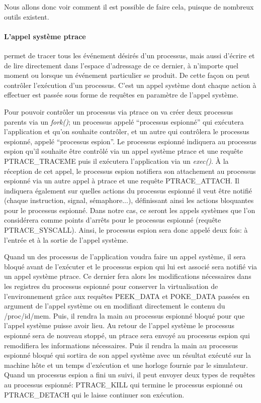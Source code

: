  Nous allons donc voir comment il est possible de faire cela, puisque de
 nombreux outils existent.
 
 \paragraph{L'appel système ptrace}\citet{INTERCEPTION:AS, INTERCEPTION:MARION}
 permet de tracer tous les événement désirés d'un processus, mais aussi d'écrire
 et de lire directement dans l'espace d'adressage de ce dernier, à n'importe
 quel moment ou lorsque un événement particulier se produit. De cette façon on
 peut contrôler l'exécution d'un processus. C'est un appel système dont chaque
 action à effectuer est passée sous forme de requêtes en paramètre de l'appel
 système.

Pour pouvoir contrôler un processus via ptrace on va créer deux processus
parents via un \textit{fork()}; un processus appelé ``processus espionné'' qui
exécutera l'application et qu'on souhaite contrôler, et un autre qui contrôlera
le processus espionné, appelé ``processus espion''. Le processus espionné
indiquera au processus espion qu'il souhaite être contrôlé via un appel système
ptrace et une requête PTRACE\_TRACEME puis il exécutera l'application via un
\textit{exec()}. À la réception de cet appel, le processus espion notifiera son
attachement au processus espionné via un autre appel à ptrace et une requête
PTRACE\_ATTACH. Il indiquera également sur quelles actions du processus espionné
il veut être notifié (chaque instruction, signal, sémaphore...), définissant
ainsi les actions bloquantes pour le processus espionné. Dans notre cas, ce
seront les appels systèmes que l'on considérera comme points d'arrêts pour le
processus espionné (requête PTRACE\_SYSCALL). Ainsi, le processus espion sera
donc appelé deux fois: à l'entrée et à la sortie de l'appel système.

Quand un des processus de l'application voudra faire un appel système, il sera
bloqué avant de l'exécuter et le processus espion qui lui est associé sera
notifié via un appel système ptrace. Ce dernier fera alors les modifications
nécessaires dans les registres du processus espionné pour conserver la
virtualisation de l'environnement grâce aux requêtes PEEK\_DATA et POKE\_DATA
passées en argument de l'appel système {\color{red}ou en modifiant directement
  le contenu du /proc/id/mem}. Puis, il rendra la main au processus espionné
bloqué pour que l'appel système puisse avoir lieu. Au retour de l'appel système
le processus espionné sera de nouveau stoppé, un ptrace sera envoyé au processus
espion qui remodifiera les informations nécessaires. Puis il rendra la main au
processus espionné bloqué qui sortira de son appel système avec un résultat
exécuté sur la machine hôte et un temps d'exécution et une horloge fournie par
le simulateur. Quand un processus espion a fini un suivi, il peut envoyer deux
types de requêtes au processus espionné: PTRACE\_KILL qui termine le processus
espionné ou PTRACE\_DETACH qui le laisse continuer son exécution.

